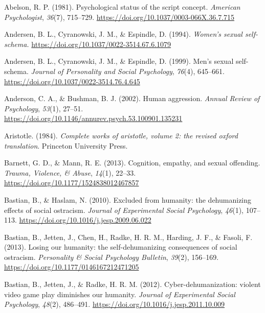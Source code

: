 \documentclass[
  english,
  donotrepeattitle,doc, 12pt, a4paper,floatsintext]{apa7}
\newlength{\cslhangindent}
\newlength{\cslentryspacingunit} %
\newenvironment{CSLReferences}[2] %
 {%
  \setlength{\parindent}{0pt}
  \ifodd #1
  \let\oldpar\par
  \def\par{\hangindent=\cslhangindent\oldpar}
  \fi
  \setlength{\parskip}{#2\cslentryspacingunit}
 }%
 {}
\begin{document}
\begingroup
\setlength{\parindent}{-0.5in}
\setlength{\leftskip}{0.5in}

\hypertarget{refs}{}
\begin{CSLReferences}{1}{0}
\leavevmode{}%
Abelson, R. P. (1981). Psychological status of the script concept. \emph{American Psychologist}, \emph{36}(7), 715--729. \url{https://doi.org/10.1037/0003-066X.36.7.715}

\leavevmode{}%
Andersen, B. L., Cyranowski, J. M., \& Espindle, D. (1994). \emph{Women's sexual self-schema.} \url{https://doi.org/10.1037/0022-3514.67.6.1079}

\leavevmode{}%
Andersen, B. L., Cyranowski, J. M., \& Espindle, D. (1999). Men's sexual self-schema. \emph{Journal of Personality and Social Psychology}, \emph{76}(4), 645--661. \url{https://doi.org/10.1037/0022-3514.76.4.645}

\leavevmode{}%
Anderson, C. A., \& Bushman, B. J. (2002). Human aggression. \emph{Annual Review of Psychology}, \emph{53}(1), 27--51. \url{https://doi.org/10.1146/annurev.psych.53.100901.135231}

\leavevmode{}%
Aristotle. (1984). \emph{Complete works of aristotle, volume 2: the revised oxford translation}. Princeton University Press.

\leavevmode{}%
Barnett, G. D., \& Mann, R. E. (2013). Cognition, empathy, and sexual offending. \emph{Trauma, Violence, \& Abuse}, \emph{14}(1), 22--33. \url{https://doi.org/10.1177/1524838012467857}

\leavevmode{}%
Bastian, B., \& Haslam, N. (2010). Excluded from humanity: the dehumanizing effects of social ostracism. \emph{Journal of Experimental Social Psychology}, \emph{46}(1), 107--113. \url{https://doi.org/10.1016/j.jesp.2009.06.022}

\leavevmode{}%
Bastian, B., Jetten, J., Chen, H., Radke, H. R. M., Harding, J. F., \& Fasoli, F. (2013). Losing our humanity: the self-dehumanizing consequences of social ostracism. \emph{Personality \& Social Psychology Bulletin}, \emph{39}(2), 156--169. \url{https://doi.org/10.1177/0146167212471205}

\leavevmode{}%
Bastian, B., Jetten, J., \& Radke, H. R. M. (2012). Cyber-dehumanization: violent video game play diminishes our humanity. \emph{Journal of Experimental Social Psychology}, \emph{48}(2), 486--491. \url{https://doi.org/10.1016/j.jesp.2011.10.009}


\end{CSLReferences}
\end{document}
